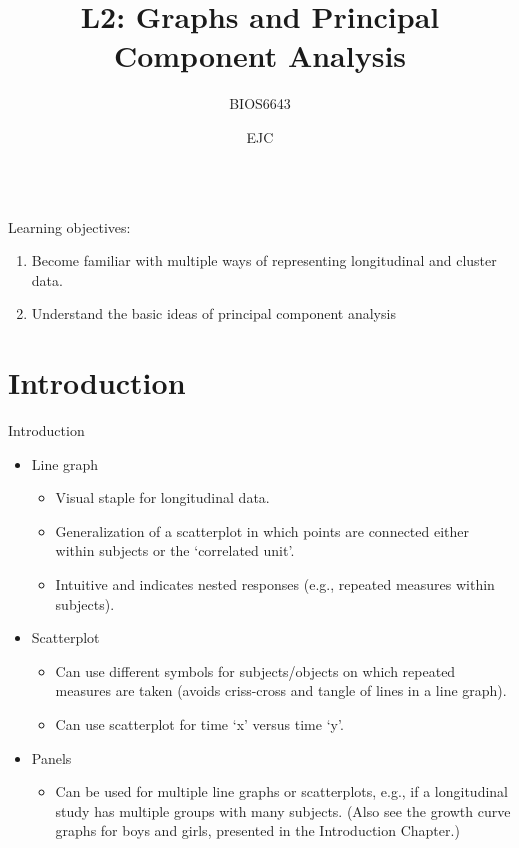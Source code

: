 \documentclass[
  9pt,
  ignorenonframetext,
]{beamer}
\title{L2: Graphs and Principal Component Analysis}
\subtitle{BIOS6643}
\author{EJC}
\date{}
\institute{Department of Biostatistics \& Informatics, UCD Anschutz}
\providecommand{\tightlist}{%
  \setlength{\itemsep}{0pt}\setlength{\parskip}{0pt}}
\begin{document}
\frame{\titlepage}

\begin{frame}
  \begin{columns}
  \column{10cm}
  \tableofcontents
  \end{columns}
\end{frame}
\begin{frame}{Learning objectives:}
\protect\hypertarget{learning-objectives}{}
\begin{enumerate}
\item
  Become familiar with multiple ways of representing longitudinal and
  cluster data.
\item
  Understand the basic ideas of principal component analysis
\end{enumerate}
\end{frame}

\hypertarget{introduction}{%
\section{Introduction}\label{introduction}}

\begin{frame}{Introduction}
\protect\hypertarget{introduction-1}{}
\begin{itemize}
\tightlist
\item
  Line graph

  \begin{itemize}
  \tightlist
  \item
    Visual staple for longitudinal data.
  \item
    Generalization of a scatterplot in which points are connected either
    within subjects or the `correlated unit'.\\
  \item
    Intuitive and indicates nested responses (e.g., repeated measures
    within subjects).
  \end{itemize}
\item
  Scatterplot

  \begin{itemize}
  \tightlist
  \item
    Can use different symbols for subjects/objects on which repeated
    measures are taken (avoids criss-cross and tangle of lines in a line
    graph).
  \item
    Can use scatterplot for time `x' versus time `y'.
  \end{itemize}
\item
  Panels

  \begin{itemize}
  \tightlist
  \item
    Can be used for multiple line graphs or scatterplots, e.g., if a
    longitudinal study has multiple groups with many subjects. (Also see
    the growth curve graphs for boys and girls, presented in the
    Introduction Chapter.)
  \end{itemize}
\end{itemize}
\end{frame}
\end{document}
